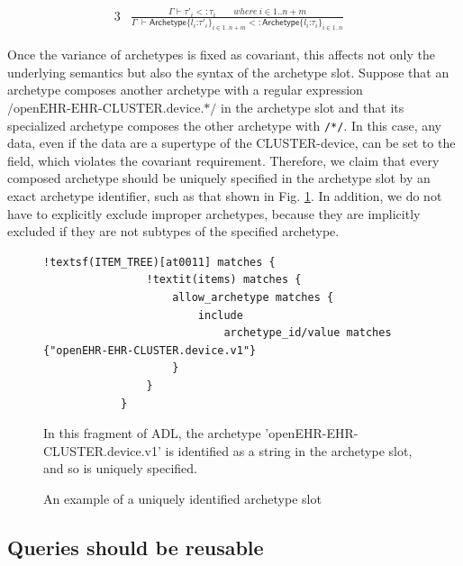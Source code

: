 \documentclass[preprint,3p,onecolumn,times,review]{article}
\begin{document}
{  \begin{alignat}{3}
    & \frac{\Gamma \vdash \tau'_i <: \tau_i \qquad where~i \in 1..n+m}
           {\Gamma ~ \vdash \mathsf{Archetype}\{l_i\text{:} \tau'_i \}_{i \in 1..n+m}  <: \mathsf{Archetype}\{l_i\text{:} \tau_i\}_{i \in 1..n}}   & \label{eqn:archetype_subtyping}
  \end{alignat}

Once the variance of archetypes is fixed as covariant, this affects not only the underlying semantics but also the syntax of the archetype slot. Suppose that an archetype composes another archetype with a regular expression $\text{/openEHR-EHR-CLUSTER.device.*/}$ in the archetype slot and that its specialized archetype composes the other archetype with \verb|/*/|. In this case, any data, even if the data are a supertype of the CLUSTER-device, can be set to the field, which violates the covariant requirement. Therefore, we claim that every composed archetype should be uniquely specified in the archetype slot by an exact archetype identifier, such as that shown in Fig. \ref{fig:archetype_slot_in_string}. In addition, we do not have to explicitly exclude improper archetypes, because they are implicitly excluded if they are not subtypes of the specified archetype.

\begin{figure}[!htbp]
\begin{minipage}{1.0\linewidth}
\begin{Verbatim}[frame=single,fontsize=\small, commandchars=!\(\)]
            !textsf(ITEM_TREE)[at0011] matches {
                !textit(items) matches {
                    allow_archetype matches {
                        include
                            archetype_id/value matches {"openEHR-EHR-CLUSTER.device.v1"}
                    }
                }
            }
\end{Verbatim}
\end{minipage}
\caption{An example of a uniquely identified archetype slot}\label{fig:archetype_slot_in_string}
{\footnotesize
  In this fragment of ADL, the archetype 'openEHR-EHR-CLUSTER.device.v1' is identified as a string in the archetype slot, and so is uniquely specified.
  }
\end{figure}



 \subsection{Queries should be reusable}

}
\end{document}
